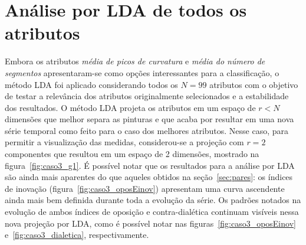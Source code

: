 \clearpage
\section{Análise por LDA de todos os atributos}
\label{subsec:lda}

Embora os atributos \emph{média de picos de curvatura} e \emph{média
  do número de segmentos} apresentaram-se como opções interessantes
para a classificação, o método LDA foi aplicado considerando todos os
$N = 99$ atributos com o objetivo de testar a relevância dos atributos
originalmente selecionados e a estabilidade dos resultados. O método
LDA projeta os atributos em um espaço de $r < N$ dimensões que melhor
separa as pinturas e que acaba por resultar em uma nova série temporal
como feito para o caso dos melhores atributos. Nesse caso, para
permitir a visualização das medidas, considerou-se a projeção com $r =
2$ componentes que resultou em um espaço de 2 dimensões, mostrado na
figura~\ref{fig:caso3_g1}. É possível notar que os resultados para a
análise por LDA são ainda mais aparentes do que aqueles obtidos na
seção~\ref{sec:pares}: os índices de inovação
(figura~\ref{fig:caso3_oposEinov}) apresentam uma curva ascendente
ainda mais bem definida durante toda a evolução da série. Os padrões
notados na evolução de ambos índices de oposição e contra-dialética
continuam visíveis nessa nova projeção por LDA, como é possível notar
nas figuras~\ref{fig:caso3_oposEinov} e~\ref{fig:caso3_dialetica},
respectivamente.

